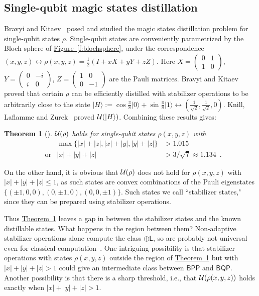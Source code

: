 \documentclass[11pt]{article}
\def\ket #1{\vert #1\rangle}
\def\abs #1{\lvert #1\rvert}
\newtheorem{theorem}{Theorem}  %
\theoremstyle{note}
\newcommand{\thmref}[1]{\hyperref[#1]{{Theorem~\ref*{#1}}}}
\newcommand{\figref}[1]{\hyperref[#1]{{Figure~\ref*{#1}}}}
\newcommand{\BQP}{{\mathsf{BQP}}}
\begin{document}
\subsection{Single-qubit magic states distillation}

Bravyi and Kitaev~\cite{BravyiKitaev04} posed and studied the magic states distillation problem for single-qubit states $\rho$.  Single-qubit states are conveniently parametrized by the Bloch sphere of \figref{f:blochsphere}, under the correspondence $(x, y, z) \leftrightarrow \rho(x,y,z) = \tfrac{1}{2} (I + x X + y Y + z Z)$.  Here $X = \left(\begin{smallmatrix}0&1\\1&0\end{smallmatrix}\right)$, $Y = \left(\begin{smallmatrix}0&-i\\i&0\end{smallmatrix}\right)$, $Z = \left(\begin{smallmatrix}1&0\\0&-1\end{smallmatrix}\right)$ are the Pauli matrices.  Bravyi and Kitaev proved that certain $\rho$ can be efficiently distilled with stabilizer operations to be arbitrarily close to the state $\ket H := \cos\frac{\pi}8 \ket 0 + \sin\frac{\pi}8 \ket 1 \leftrightarrow (\frac1{\sqrt 2}, \frac1{\sqrt 2}, 0)$.  Knill, Laflamme and Zurek~\cite{KnillLaflammeZurekProcRSocLondA98} proved $\magic{\ket H}$.  Combining these results gives: 

\begin{theorem}[\cite{BravyiKitaev04}] \label{t:BravyiKitaev04}
$\mathcal{U}(\rho)$ holds for single-qubit states $\rho(x,y,z)$ with 
\begin{align}
&& \max\{\abs{x} + \abs{z}, \abs{x} + \abs{y}, \abs{y} + \abs{z}\}  &> 1.015 \label{e:BravyiKitaev04H} \\ 
&\text{or} & \abs{x} + \abs{y} + \abs{z} &> 3/\sqrt{7} \approx 1.134
 \enspace . \label{e:BravyiKitaev04T}
\end{align}
\end{theorem}

On the other hand, it is obvious that $\mathcal{U}(\rho)$ does not hold for $\rho(x,y,z)$ with $\abs x + \abs y + \abs z \leq 1$, as such states are convex combinations of the Pauli eigenstates $\{(\pm 1, 0, 0), (0, \pm 1, 0), (0,  0, \pm 1)\}$.  Such states we call ``stabilizer states," since they can be prepared using stabilizer operations.  

Thus \thmref{t:BravyiKitaev04} leaves a gap in between the stabilizer states and the known distillable states.  What happens in the region between them?  Non-adaptive stabilizer operations alone compute the class $\mathsf{\oplus L}$, so are probably not universal even for classical computation~\cite{AaronsonGottesman04}.  One intriguing possibility is that stabilizer operations with states $\rho(x,y,z)$ outside the region of \thmref{t:BravyiKitaev04} but with $\abs x + \abs y + \abs z > 1$ could give an intermediate class between $\mathsf{BPP}$ and $\BQP$.  Another possibility is that there is a sharp threshold, i.e., that $\mathcal{U}(\rho(x,y,z))$ holds exactly when $\abs x + \abs y + \abs z > 1$.  
\end{document}
